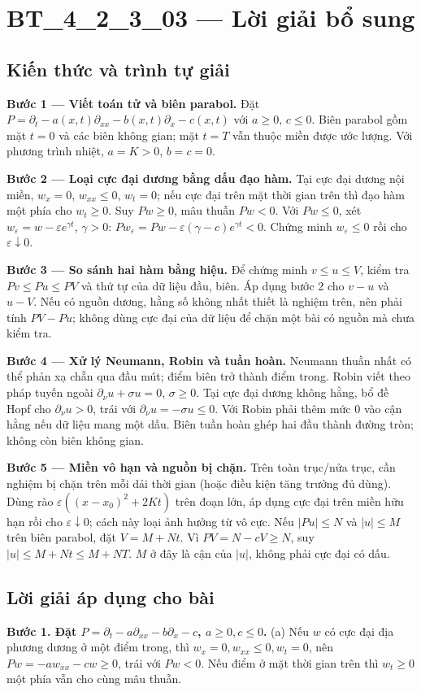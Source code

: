 \documentclass[10pt,a4paper]{article}
\begin{document}
\section*{BT\_4\_2\_3\_03 — Lời giải bổ sung}
\subsection*{Kiến thức và trình tự giải}
\textbf{Bước 1 — Viết toán tử và biên parabol.} Đặt $P=\partial_t-a(x,t)\partial_{xx}-b(x,t)\partial_x-c(x,t)$ với $a\ge0$, $c\le0$. Biên parabol gồm mặt $t=0$ và các biên không gian; mặt $t=T$ vẫn thuộc miền được ước lượng. Với phương trình nhiệt, $a=K>0$, $b=c=0$.

\textbf{Bước 2 — Loại cực đại dương bằng dấu đạo hàm.} Tại cực đại dương nội miền, $w_x=0$, $w_{xx}\le0$, $w_t=0$; nếu cực đại trên mặt thời gian trên thì đạo hàm một phía cho $w_t\ge0$. Suy $Pw\ge0$, mâu thuẫn $Pw<0$. Với $Pw\le0$, xét $w_\varepsilon=w-\varepsilon e^{\gamma t}$, $\gamma>0$: $Pw_\varepsilon=Pw-\varepsilon(\gamma-c)e^{\gamma t}<0$. Chứng minh $w_\varepsilon\le0$ rồi cho $\varepsilon\downarrow0$.

\textbf{Bước 3 — So sánh hai hàm bằng hiệu.} Để chứng minh $v\le u\le V$, kiểm tra $Pv\le Pu\le PV$ và thứ tự của dữ liệu đầu, biên. Áp dụng bước 2 cho $v-u$ và $u-V$. Nếu có nguồn dương, hằng số không nhất thiết là nghiệm trên, nên phải tính $PV-Pu$; không dùng cực đại của dữ liệu để chặn một bài có nguồn mà chưa kiểm tra.

\textbf{Bước 4 — Xử lý Neumann, Robin và tuần hoàn.} Neumann thuần nhất có thể phản xạ chẵn qua đầu mút; điểm biên trở thành điểm trong. Robin viết theo pháp tuyến ngoài $\partial_\nu u+\sigma u=0$, $\sigma\ge0$. Tại cực đại dương không hằng, bổ đề Hopf cho $\partial_\nu u>0$, trái với $\partial_\nu u=-\sigma u\le0$. Với Robin phải thêm mức $0$ vào cận hằng nếu dữ liệu mang một dấu. Biên tuần hoàn ghép hai đầu thành đường tròn; không còn biên không gian.

\textbf{Bước 5 — Miền vô hạn và nguồn bị chặn.} Trên toàn trục/nửa trục, cần nghiệm bị chặn trên mỗi dải thời gian (hoặc điều kiện tăng trưởng đủ dùng). Dùng rào $\varepsilon((x-x_0)^2+2Kt)$ trên đoạn lớn, áp dụng cực đại trên miền hữu hạn rồi cho $\varepsilon\downarrow0$; cách này loại ảnh hưởng từ vô cực. Nếu $|Pu|\le N$ và $|u|\le M$ trên biên parabol, đặt $V=M+Nt$. Vì $PV=N-cV\ge N$, suy $|u|\le M+Nt\le M+NT$. $M$ ở đây là cận của $|u|$, không phải cực đại có dấu.
\subsection*{Lời giải áp dụng cho bài}
\textbf{Bước 1. Đặt $P=\partial_t-a\partial_{xx}-b\partial_x-c$, $a\ge0,c\le0$.}
(a) Nếu $w$ có cực đại địa phương dương ở một điểm trong, thì $w_x=0,w_{xx}\le0,w_t=0$, nên $Pw=-aw_{xx}-cw\ge0$, trái với $Pw<0$. Nếu điểm ở mặt thời gian trên thì $w_t\ge0$ một phía vẫn cho cùng mâu thuẫn.
\end{document}
